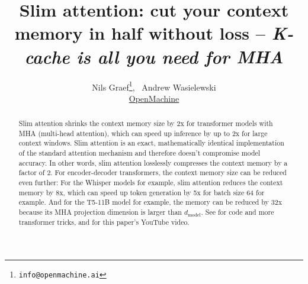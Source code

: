 \documentclass{article}
\title{Slim attention: cut your context memory in half without loss -- \emph{K-cache is all you need for MHA}}
\author{Nils Graef\thanks{\texttt{info@openmachine.ai}}, \, Andrew Wasielewski \\
  \href{https://openmachine.ai}{OpenMachine}}
\begin{document}
 \maketitle

\begin{abstract}
Slim attention shrinks the context memory size by 2x for transformer models with MHA (multi-head attention), which can speed up inference by up to 2x for large context windows. Slim attention is an exact, mathematically identical implementation of the standard attention mechanism and therefore doesn’t compromise model accuracy. In other words, slim attention losslessly compresses the context memory by a factor of 2. For encoder-decoder transformers, the context memory size can be reduced even further: For the Whisper models for example, slim attention reduces the context memory by 8x, which can speed up token generation by 5x for batch size 64 for example. And for the T5-11B model for example, the memory can be reduced by 32x because its MHA projection dimension is larger than $d_{\text{model}}$. See \citep{tricks} for code and more transformer tricks, and \citep{slim-video} for this paper's YouTube video.
\end{abstract}
\end{document}
